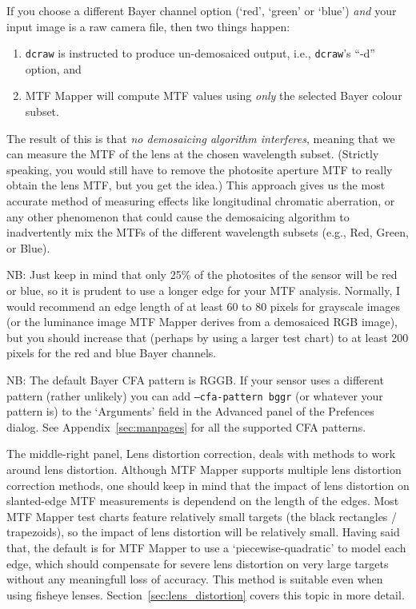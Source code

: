 \documentclass[a4paper]{article}
\begin{document}
If you choose a different \textsf{Bayer channel} option (`red', `green' or
`blue') \emph{and} your input image is a raw camera file, then two things
happen:
\begin{enumerate}
\item 
\texttt{dcraw} is instructed to produce un-demosaiced output, i.e., \texttt{dcraw}'s ``-d'' option, and
\item 
MTF Mapper will compute MTF values using \emph{only} the selected Bayer
colour subset. 
\end{enumerate}
The result of this is that \emph{no demosaicing algorithm interferes},
meaning that we can measure the MTF of the lens at the chosen wavelength
subset. (Strictly speaking, you would still have to remove the photosite aperture MTF
to really obtain the lens MTF, but you get the idea.)
This approach gives us the most accurate method of measuring effects like
longitudinal chromatic aberration, or any other phenomenon that could cause
the demosaicing algorithm to inadvertently mix the MTFs of the different
wavelength subsets (e.g., Red, Green, or Blue).


NB: Just keep in mind that only 25\% of the photosites of the sensor will be
red or blue, so it is prudent to use a longer edge for your MTF analysis.
Normally, I would recommend an edge length of at least 60 to 80 pixels for
grayscale images (or the luminance image MTF Mapper derives from a
demosaiced RGB image), but you should increase that (perhaps by using a larger
test chart) to at least 200 pixels for the red and blue Bayer channels.

NB: The default Bayer CFA pattern is RGGB.  If your sensor uses a different
pattern (rather unlikely) you can add \texttt{--cfa-pattern bggr} (or
whatever your pattern is) to the `Arguments' field in the \textsf{Advanced}
panel of the \textsf{Prefences} dialog. See Appendix~\ref{sec:manpages} for
all the supported CFA patterns.

The middle-right panel, \textsf{Lens distortion correction}, deals with
methods to work around lens distortion. Although MTF Mapper supports
multiple lens distortion correction methods, one should keep in mind that
the impact of lens distortion on slanted-edge MTF measurements is 
dependend on the length of the edges. Most MTF Mapper test charts feature
relatively small targets (the black rectangles / trapezoids), so the impact
of lens distortion will be relatively small. Having said that, the default
is for MTF Mapper to use a `piecewise-quadratic' to model each edge, which
should compensate for severe lens distortion on very large targets without
any meaningfull loss of accuracy. This method is suitable even when using
fisheye lenses. Section~\ref{sec:lens_distortion} covers this topic in more
detail.
\end{document}

